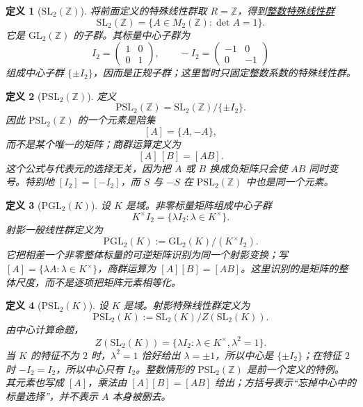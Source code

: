 \documentclass[UTF8,fontset=none,a4paper,11pt]{ctexart}
\theoremstyle{foundation-definition}
\newtheorem{definition}{定义}[section]
\theoremstyle{foundation-theorem}
\theoremstyle{foundation-proposition}
\theoremstyle{foundation-example}
\theoremstyle{foundation-remark}
\theoremstyle{foundation-theorem}
\newcommand{\term}[2]{\hyperref[#1]{#2}}
\begin{document}
\begin{definition}[\(\mathrm{SL}_2(\mathbb Z)\)]\label{def:sl2-integer}
将前面定义的特殊线性群取 \(R=\mathbb Z\)，得到\term{def:sl2-integer}{整数特殊线性群}
\[
\mathrm{SL}_2(\mathbb Z)
=\{A\in M_2(\mathbb Z):\det A=1\}.
\]
它是 \(\mathrm{GL}_2(\mathbb Z)\) 的子群。其标量中心子群为
\[
I_2=\begin{pmatrix}1&0\\0&1\end{pmatrix},
\qquad
-I_2=\begin{pmatrix}-1&0\\0&-1\end{pmatrix}
\]
组成中心子群 \(\{\pm I_2\}\)，因而是正规子群；这里暂时只固定整数系数的特殊线性群。
\end{definition}

\begin{definition}[\(\mathrm{PSL}_2(\mathbb Z)\)]\label{def:psl}
定义
\[
\mathrm{PSL}_2(\mathbb Z)
=\mathrm{SL}_2(\mathbb Z)/\{\pm I_2\}.
\]
因此 \(\mathrm{PSL}_2(\mathbb Z)\) 的一个元素是陪集
\[
[A]=\{A,-A\},
\]
而不是某个唯一的矩阵；商群运算定义为
\[
[A]\,[B]=[AB].
\]
这个公式与代表元的选择无关，因为把 \(A\) 或 \(B\) 换成负矩阵只会使
\(AB\) 同时变号。特别地 \([I_2]=[-I_2]\)，而 \(S\) 与 \(-S\) 在
\(\mathrm{PSL}_2(\mathbb Z)\) 中也是同一个元素。
\end{definition}

\begin{definition}[\(\mathrm{PGL}_2(K)\)]\label{def:projective-linear-group}
设 \(K\) 是域。非零标量矩阵组成中心子群
\[
K^\times I_2=\{\lambda I_2:\lambda\in K^\times\}.
\]
射影一般线性群定义为
\[
\mathrm{PGL}_2(K):=\mathrm{GL}_2(K)/(K^\times I_2).
\]
它把相差一个非零整体标量的可逆矩阵识别为同一个射影变换；写
\([A]=\{\lambda A:\lambda\in K^\times\}\)，商群运算为
\([A][B]=[AB]\)。这里识别的是矩阵的整体尺度，而不是逐项把矩阵元素相等化。
\end{definition}

\begin{definition}[\(\mathrm{PSL}_2(K)\)]\label{def:projective-special-linear-group}
设 \(K\) 是域。射影特殊线性群定义为
\[
\mathrm{PSL}_2(K):=\mathrm{SL}_2(K)/Z(\mathrm{SL}_2(K)).
\]
由中心计算命题，
\[
Z(\mathrm{SL}_2(K))
=\{\lambda I_2:\lambda\in K^\times,\lambda^2=1\}.
\]
当 \(K\) 的特征不为 \(2\) 时，\(\lambda^2=1\) 恰好给出
\(\lambda=\pm1\)，所以中心是 \(\{\pm I_2\}\)；在特征 \(2\) 时
\(-I_2=I_2\)，所以中心只有 \(I_2\)。整数情形的 \(\mathrm{PSL}_2(\mathbb Z)\) 是前一个定义的特例。
其元素也写成 \([A]\)，乘法由 \([A][B]=[AB]\) 给出；方括号表示“忘掉中心中的
标量选择”，并不表示 \(A\) 本身被删去。
\end{definition}
\end{document}
